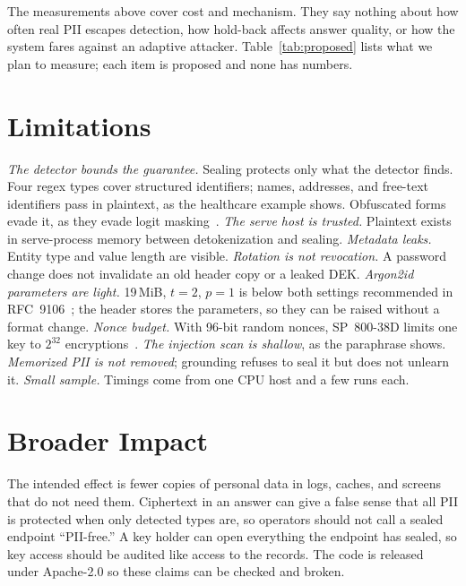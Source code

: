 \documentclass[conference]{IEEEtran}
\begin{document}
The measurements above cover cost and mechanism. They say nothing about how often real PII escapes detection, how hold-back affects answer quality, or how the system fares against an adaptive attacker. Table~\ref{tab:proposed} lists what we plan to measure; each item is proposed and none has numbers.

\section{Limitations}
\label{sec:limits}

\textit{The detector bounds the guarantee.} Sealing protects only what the detector finds. Four regex types cover structured identifiers; names, addresses, and free-text identifiers pass in plaintext, as the healthcare example shows. Obfuscated forms evade it, as they evade logit masking~\cite{ram2025constrained}.
\textit{The serve host is trusted.} Plaintext exists in serve-process memory between detokenization and sealing.
\textit{Metadata leaks.} Entity type and value length are visible.
\textit{Rotation is not revocation.} A password change does not invalidate an old header copy or a leaked DEK.
\textit{Argon2id parameters are light.} 19\,MiB, $t{=}2$, $p{=}1$ is below both settings recommended in RFC~9106~\cite{rfc9106}; the header stores the parameters, so they can be raised without a format change.
\textit{Nonce budget.} With 96-bit random nonces, SP~800-38D limits one key to $2^{32}$ encryptions~\cite{nist80038d}.
\textit{The injection scan is shallow}, as the paraphrase shows.
\textit{Memorized PII is not removed}; grounding refuses to seal it but does not unlearn it.
\textit{Small sample.} Timings come from one CPU host and a few runs each.

\section{Broader Impact}

The intended effect is fewer copies of personal data in logs, caches, and screens that do not need them. Ciphertext in an answer can give a false sense that all PII is protected when only detected types are, so operators should not call a sealed endpoint ``PII-free.'' A key holder can open everything the endpoint has sealed, so key access should be audited like access to the records. The code is released under Apache-2.0 so these claims can be checked and broken.
\end{document}
